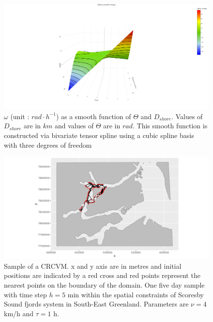 \documentclass[11pt]{article}
\newcommand {\1}{\mathbb{1}}
\begin{document}
\begin{figure}[H]
		\centering
		\includegraphics[scale=0.25]{images/simulation study/spline_smooth_omega_rect.png}
		\caption{$\omega$ (unit : $rad \cdot h^{-1}$) as a smooth function of $\Theta$ and $D_{shore}$. Values of $D_{shore}$ are in $km$ and values of $\Theta$ are in $rad$.
		This smooth function is constructed via bivariate tensor spline using a cubic spline basis with three degrees of freedom}
	\label{fig: splineomega}
\end{figure}




\begin{figure}[H]
		\centering
		\includegraphics[scale=0.7]{images/simulation study/illustrative_sample_fjords.png}
	\caption{Sample of a CRCVM. x and y axis are in metres and initial positions are indicated by a red cross and red points represent the nearest points on the boundary of the domain. One  five day sample with time step $h=5$ min within the spatial constraints of Scoresby Sound fjords system in South-East Greenland. Parameters are $\nu=4$ km/h and $\tau=1$ h. }
	\label{fig: samples_fjords_CRCVM}
\end{figure}
\end{document}
